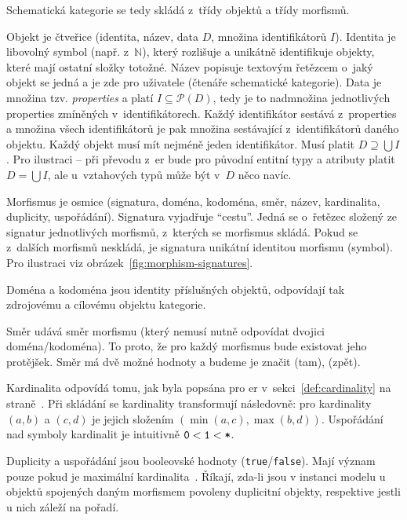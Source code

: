 Schematická kategorie se tedy skládá z~třídy objektů a třídy morfismů.

Objekt je čtveřice (identita, název, data $D$, množina identifikátorů $I$).
Identita je libovolný symbol (např. z~$\mathbb N$), který rozlišuje a unikátně identifikuje objekty, které mají ostatní složky totožné.
Název popisuje textovým řetězcem o~jaký objekt se jedná a je zde pro uživatele (čtenáře schematické kategorie).
Data je množina tzv. \emph{properties} a platí $I\subseteq \mathcal P(D)$, tedy je to nadmnožina jednotlivých properties zmíněných v~identifikátorech.
Každý identifikátor sestává z~properties a množina všech identifikátorů je pak množina sestávající z~identifikátorů daného objektu.
Každý objekt musí mít nejméně jeden identifikátor.
Musí platit $D\supseteq \bigcup I$.
Pro ilustraci -- při převodu z~\acrshort{er} bude pro původní entitní typy a atributy platit $D = \bigcup I$, ale u~vztahových typů může být v~$D$ něco navíc.

Morfismus je osmice (signatura, doména, kodoména, směr, název, kardinalita, duplicity, uspořádání).
Signatura vyjadřuje \enquote{cestu}.
Jedná se o~řetězec složený ze signatur jednotlivých morfismů, z~kterých se morfismus skládá.
Pokud se z~dalších morfismů neskládá, je signatura unikátní identitou morfismu (symbol).
Pro ilustraci viz obrázek~\ref{fig:morphism-signatures}.

Doména a kodoména jsou identity příslušných objektů, odpovídají tak zdrojovému a cílovému objektu kategorie.

Směr udává směr morfismu (který nemusí nutně odpovídat dvojici doména/kodoména).
To proto, že pro každý morfismus bude existovat jeho protějšek.
Směr má dvě možné hodnoty a budeme je značit \one{} (tam), \zero{} (zpět).

Kardinalita odpovídá tomu, jak byla popsána pro \acrshort{er} v~sekci~\ref{def:cardinality} na straně~\pageref{def:cardinality}.
Při skládání se kardinality transformují následovně: pro kardinality $(a, b)$ a $(c, d)$ je jejich složením $(\min(a, c), \max(b, d))$.
Uspořádání nad symboly kardinalit je intuitivně $\texttt{0} < \texttt{1} < \texttt{*}$.

Duplicity a uspořádání jsou booleovské hodnoty (\texttt{true}/\texttt{false}).
Mají význam pouze pokud je maximální kardinalita~\many.
Říkají, zda-li jsou v instanci modelu u objektů spojených daným morfismem povoleny duplicitní objekty, respektive jestli u nich záleží na pořadí.

